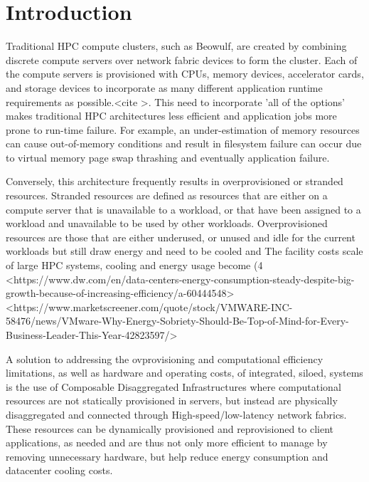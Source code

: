 \section{Introduction}

Traditional HPC compute clusters, such as Beowulf, are created by combining discrete compute servers over network fabric devices to form the cluster.  Each of the compute servers is provisioned with CPUs, memory devices, accelerator cards, and storage devices to incorporate as many different application runtime requirements as possible.<cite >. This need to incorporate 'all of the options' makes traditional HPC architectures less efficient and application jobs more prone to run-time failure.    
For example, an under-estimation of memory resources can cause out-of-memory conditions and result in filesystem failure can occur due to virtual memory page swap thrashing and eventually application failure.

Conversely, this architecture frequently results in overprovisioned or stranded resources.  Stranded resources are defined as resources that are either on a compute server that is unavailable to a workload, or that have been assigned to a workload and unavailable to be used by other workloads. Overprovisioned resources are those that are either underused, or unused and idle for the current workloads but still draw energy and need to be cooled and The facility costs scale of large HPC systems, cooling and energy usage become  
  (4%
  <https://www.dw.com/en/data-centers-energy-consumption-steady-despite-big-growth-because-of-increasing-efficiency/a-60444548>
  <https://www.marketscreener.com/quote/stock/VMWARE-INC-58476/news/VMware-Why-Energy-Sobriety-Should-Be-Top-of-Mind-for-Every-Business-Leader-This-Year-42823597/>
  
A solution to addressing the ovprovisioning and computational efficiency limitations, as well as hardware and operating costs, of integrated, siloed, systems is the use of Composable Disaggregated Infrastructures where computational resources are not statically provisioned in servers, but instead are physically disaggregated and connected through High-speed/low-latency network fabrics.  These resources can be dynamically provisioned and reprovisioned to client applications, as needed and are thus not only more efficient to manage by removing unnecessary hardware, but help reduce energy consumption and datacenter cooling costs.

